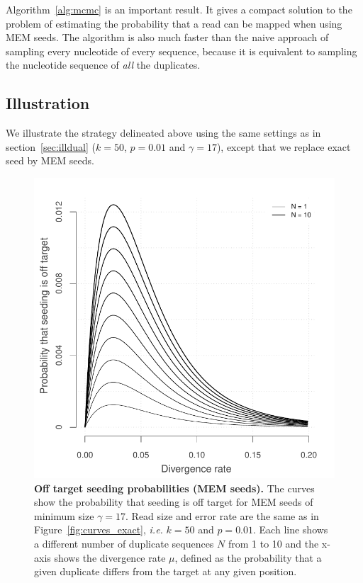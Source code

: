\documentclass{article}
\begin{document}
Algorithm~\ref{alg:mcmc} is an important result. It gives a compact
solution to the problem of estimating the probability that a read can be
mapped when using MEM seeds. The algorithm is also much faster than the
naive approach of sampling every nucleotide of every sequence, because it
is equivalent to sampling the nucleotide sequence of \emph{all} the
duplicates.

\subsection{Illustration}
\label{sec:illmem}

We illustrate the strategy delineated above 
using the same settings as in section~\ref{sec:illdual} ($k=50$, $p=0.01$
and $\gamma=17$), except that we replace exact seed by MEM seeds.

\begin{figure}[h]
\centering
\includegraphics[scale=0.65]{curves_mem.pdf}
\caption{\textbf{Off target seeding probabilities (MEM seeds).}
The curves show the probability that seeding is off target for MEM
seeds of minimum size $\gamma=17$. Read size and error rate are the same
as in Figure~\ref{fig:curves_exact}, \textit{i.e.} $k=50$ and $p=0.01$. Each
line shows a different number of duplicate sequences $N$ from 1 to 10 and
the x-axis shows the divergence rate $\mu$, defined as the probability
that a given duplicate differs from the target at any given position.}
\label{fig:curves_mem}
\end{figure}
\end{document}
